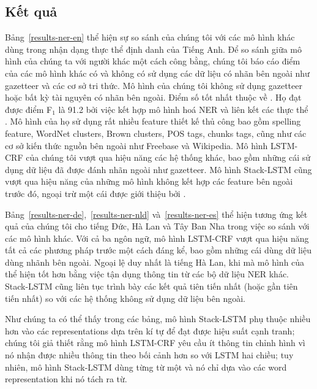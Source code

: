 \documentclass[11pt,letterpaper]{article}
\begin{document}
\subsection{Kết quả}

Bảng~\ref{results-ner-en} thể hiện sự so sánh của chúng tôi với các mô hình khác dùng trong nhận dạng thực thể định danh của Tiếng Anh. Để so sánh giữa mô hình của chúng ta với người khác một cách công bằng, chúng tôi báo cáo điểm của các mô hình khác có và không có sử dụng các dữ liệu có nhãn bên ngoài như gazetteer và các cơ sở tri thức. Mô hình của chúng tôi không sử dụng gazetteer hoặc bất kỳ tài nguyên có nhãn bên ngoài. Điểm số tốt nhất thuộc về . Họ đạt được điểm F$_1$ là 91.2 bởi việc kết hợp mô hình hoá NER và liên kết các thực thể \cite{hoffart2011robust}. Mô hình của họ sử dụng rất nhiều feature thiết kế thủ công bao gồm spelling feature, WordNet clusters, Brown clusters, POS tags, chunks tags, cũng như các cơ sở kiến thức nguồn bên ngoài như Freebase và Wikipedia. Mô hình LSTM-CRF của chúng tôi vượt qua hiệu năng các hệ thống khác, bao gồm những cái sử dụng dữ liệu đã được đánh nhãn ngoài như gazetteer. Mô hình Stack-LSTM cũng vượt qua hiệu năng của những mô hình không kết hợp các feature bên ngoài trước đó, ngoại trừ một cái được giới thiệu bởi .

Bảng~\ref{results-ner-de},~\ref{results-ner-nld} và~\ref{results-ner-es} thể hiện tương ứng kết quả của chúng tôi cho tiếng Đức, Hà Lan và Tây Ban Nha trong việc so sánh với các mô hình khác. Với cả ba ngôn ngữ, mô hình LSTM-CRF vượt qua hiệu năng tất cả các phương pháp trước một cách đáng kể, bao gồm những cái dùng dữ liệu dùng nhãnh bên ngoài. Ngoại lệ duy nhất là tiếng Hà Lan, khi mà mô hình của  thể hiện tốt hơn bằng việc tận dụng thông tin từ các bộ dữ liệu NER khác. Stack-LSTM cũng liên tục trình bày các kết quả tiên tiến nhất (hoặc gần tiên tiến nhất) so với các hệ thống không sử dụng dữ liệu bên ngoài.

Như chúng ta có thể thấy trong các bảng, mô hình Stack-LSTM phụ thuộc nhiều hơn vào các representations dựa trên kí tự để đạt được hiệu suất cạnh tranh; chúng tôi giả thiết rằng mô hình LSTM-CRF yêu cầu ít thông tin chỉnh hình vì nó nhận được nhiều thông tin theo bối cảnh hơn so với LSTM hai chiều; tuy nhiên, mô hình Stack-LSTM dùng từng từ một và nó chỉ dựa vào các word representation khi nó tách ra từ.
\end{document}
